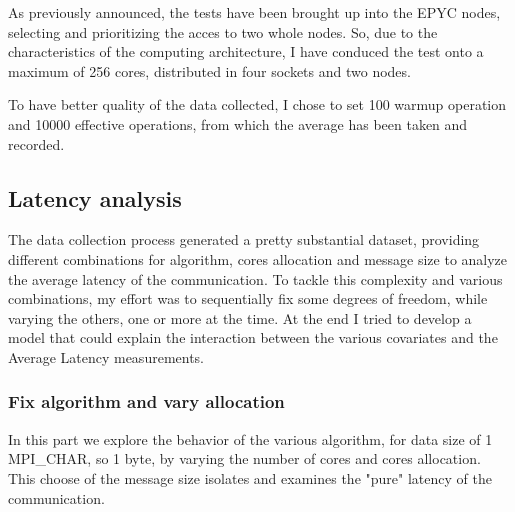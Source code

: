 \documentclass{article}
\begin{document}
	As previously announced, the tests have been brought up into the EPYC nodes, selecting and prioritizing the acces to two whole nodes. So, due to the characteristics of the computing architecture, I have conduced the test onto a maximum of 256 cores, distributed in four sockets and two nodes.
	
	To have better quality of the data collected, I chose to set 100 warmup operation and 10000 effective operations, from which the average has been taken and recorded.
	
	\subsection{Latency analysis}
	
	The data collection process generated a pretty substantial dataset, providing different combinations for algorithm, cores allocation and message size to analyze the average latency of the communication.
	To tackle this complexity and various combinations, my effort was to sequentially fix some degrees of freedom, while varying the others, one or more at the time. At the end I tried to develop a model that could explain the interaction between the various covariates and the Average Latency measurements.
	
	\subsubsection{Fix algorithm and vary allocation}
	
	In this part we explore the behavior of the various algorithm, for data size of 1 MPI\_CHAR, so 1 byte, by varying the number of cores and cores allocation. This choose of the message size isolates and examines the "pure" latency of the communication.
	
	
\end{document}
